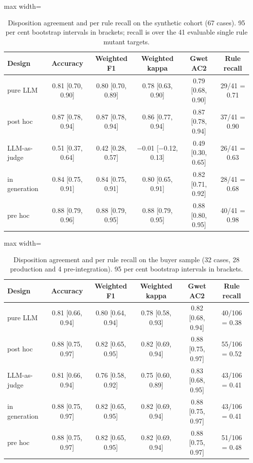 \begin{table}[htbp]
\centering
\caption{Disposition agreement and per rule recall on the synthetic cohort (67 cases). 95 per cent bootstrap intervals in brackets; recall is over the 41 evaluable single rule mutant targets.}
\label{tab:app:dispsynth}
\footnotesize
\begin{adjustbox}{max width=\textwidth}
\begin{tabular}{@{}lccccc@{}}
\toprule
\textbf{Design} & \textbf{Accuracy} & \textbf{Weighted F1} & \textbf{Weighted kappa} & \textbf{Gwet AC2} & \textbf{Rule recall} \\
\midrule
pure LLM      & 0.81 [0.70, 0.90] & 0.80 [0.70, 0.89] & 0.78 [0.63, 0.90]        & 0.79 [0.68, 0.90] & 29/41 = 0.71 \\
post hoc      & 0.87 [0.78, 0.94] & 0.87 [0.78, 0.94] & 0.86 [0.77, 0.94]        & 0.87 [0.78, 0.94] & 37/41 = 0.90 \\
LLM-as-judge  & 0.51 [0.37, 0.64] & 0.42 [0.28, 0.57] & $-$0.01 [$-$0.12, 0.13]  & 0.49 [0.30, 0.65] & 26/41 = 0.63 \\
in generation & 0.84 [0.75, 0.91] & 0.84 [0.75, 0.91] & 0.80 [0.65, 0.91]        & 0.82 [0.71, 0.92] & 28/41 = 0.68 \\
pre hoc       & 0.88 [0.79, 0.96] & 0.88 [0.79, 0.95] & 0.88 [0.79, 0.95]        & 0.88 [0.80, 0.95] & 40/41 = 0.98 \\
\bottomrule
\end{tabular}
\end{adjustbox}
\end{table}

\begin{table}[htbp]
\centering
\caption{Disposition agreement and per rule recall on the buyer sample (32 cases, 28 production and 4 pre-integration). 95 per cent bootstrap intervals in brackets.}
\label{tab:app:dispbuyer}
\footnotesize
\begin{adjustbox}{max width=\textwidth}
\begin{tabular}{@{}lccccc@{}}
\toprule
\textbf{Design} & \textbf{Accuracy} & \textbf{Weighted F1} & \textbf{Weighted kappa} & \textbf{Gwet AC2} & \textbf{Rule recall} \\
\midrule
pure LLM      & 0.81 [0.66, 0.94] & 0.80 [0.64, 0.94] & 0.78 [0.58, 0.93] & 0.82 [0.68, 0.94] & 40/106 = 0.38 \\
post hoc      & 0.88 [0.75, 0.97] & 0.82 [0.65, 0.95] & 0.82 [0.69, 0.94] & 0.88 [0.75, 0.97] & 55/106 = 0.52 \\
LLM-as-judge  & 0.81 [0.66, 0.94] & 0.76 [0.58, 0.92] & 0.75 [0.60, 0.89] & 0.83 [0.68, 0.95] & 43/106 = 0.41 \\
in generation & 0.88 [0.75, 0.97] & 0.82 [0.65, 0.95] & 0.82 [0.69, 0.94] & 0.88 [0.75, 0.97] & 43/106 = 0.41 \\
pre hoc       & 0.88 [0.75, 0.97] & 0.82 [0.65, 0.95] & 0.82 [0.69, 0.94] & 0.88 [0.75, 0.97] & 51/106 = 0.48 \\
\bottomrule
\end{tabular}
\end{adjustbox}
\end{table}

